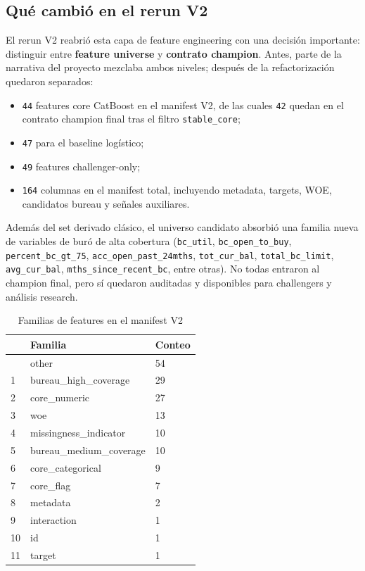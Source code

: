 \documentclass[
  spanish,
  11pt,
  letterpaper,
]{scrbook}
\providecommand{\tightlist}{%
  \setlength{\itemsep}{0pt}\setlength{\parskip}{0pt}}
\theoremstyle{plain}
\theoremstyle{remark}
\begin{document}
\subsection{Qué cambió en el rerun
V2}\label{quuxe9-cambiuxf3-en-el-rerun-v2}

El rerun V2 reabrió esta capa de feature engineering con una decisión
importante: distinguir entre \textbf{feature universe} y
\textbf{contrato champion}. Antes, parte de la narrativa del proyecto
mezclaba ambos niveles; después de la refactorización quedaron
separados:

\begin{itemize}
\tightlist
\item
  \texttt{44} features core CatBoost en el manifest V2, de las cuales
  \texttt{42} quedan en el contrato champion final tras el filtro
  \texttt{stable\_core};
\item
  \texttt{47} para el baseline logístico;
\item
  \texttt{49} features challenger-only;
\item
  \texttt{164} columnas en el manifest total, incluyendo metadata,
  targets, WOE, candidatos bureau y señales auxiliares.
\end{itemize}

Además del set derivado clásico, el universo candidato absorbió una
familia nueva de variables de buró de alta cobertura (\texttt{bc\_util},
\texttt{bc\_open\_to\_buy}, \texttt{percent\_bc\_gt\_75},
\texttt{acc\_open\_past\_24mths}, \texttt{tot\_cur\_bal},
\texttt{total\_bc\_limit}, \texttt{avg\_cur\_bal},
\texttt{mths\_since\_recent\_bc}, entre otras). No todas entraron al
champion final, pero sí quedaron auditadas y disponibles para
challengers y análisis research.

{

\begin{longtable}[]{@{}lll@{}}

\caption{\label{tbl-feature-families-v2}Familias de features en el
manifest V2}

\tabularnewline

\toprule\noalign{}
& Familia & Conteo \\
\midrule\noalign{}
\endhead
\bottomrule\noalign{}
\endlastfoot
0 & other & 54 \\
1 & bureau\_high\_coverage & 29 \\
2 & core\_numeric & 27 \\
3 & woe & 13 \\
4 & missingness\_indicator & 10 \\
5 & bureau\_medium\_coverage & 10 \\
6 & core\_categorical & 9 \\
7 & core\_flag & 7 \\
8 & metadata & 2 \\
9 & interaction & 1 \\
10 & id & 1 \\
11 & target & 1 \\

\end{longtable}

}
\end{document}
